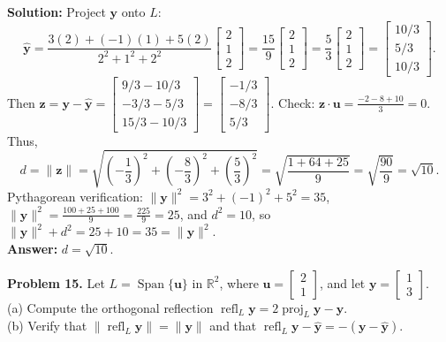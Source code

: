 \documentclass[11pt, letterpaper]{article}
\theoremstyle{definition}
\theoremstyle{remark}
\begin{document}
\textbf{Solution:} Project $\mathbf{y}$ onto $L$:
\[
\hat{\mathbf{y}} = \frac{3(2) + (-1)(1) + 5(2)}{2^2 + 1^2 + 2^2}\begin{bmatrix} 2 \\ 1 \\ 2 \end{bmatrix} = \frac{15}{9}\begin{bmatrix} 2 \\ 1 \\ 2 \end{bmatrix} = \frac{5}{3}\begin{bmatrix} 2 \\ 1 \\ 2 \end{bmatrix} = \begin{bmatrix} 10/3 \\ 5/3 \\ 10/3 \end{bmatrix}.
\]
Then $\mathbf{z} = \mathbf{y} - \hat{\mathbf{y}} = \begin{bmatrix} 9/3 - 10/3 \\ -3/3 - 5/3 \\ 15/3 - 10/3 \end{bmatrix} = \begin{bmatrix} -1/3 \\ -8/3 \\ 5/3 \end{bmatrix}$. Check: $\mathbf{z} \cdot \mathbf{u} = \frac{-2 - 8 + 10}{3} = 0$. Thus,
\[
d = \|\mathbf{z}\| = \sqrt{\left(-\frac{1}{3}\right)^2 + \left(-\frac{8}{3}\right)^2 + \left(\frac{5}{3}\right)^2} = \sqrt{\frac{1 + 64 + 25}{9}} = \sqrt{\frac{90}{9}} = \sqrt{10}.
\]
Pythagorean verification: $\|\mathbf{y}\|^2 = 3^2 + (-1)^2 + 5^2 = 35$, $\|\hat{\mathbf{y}}\|^2 = \frac{100 + 25 + 100}{9} = \frac{225}{9} = 25$, and $d^2 = 10$, so $\|\hat{\mathbf{y}}\|^2 + d^2 = 25 + 10 = 35 = \|\mathbf{y}\|^2$. \\
\textbf{Answer:} $d = \sqrt{10}$.

\textbf{Problem 15.} Let $L = \operatorname{Span}\{\mathbf{u}\}$ in $\mathbb{R}^2$, where $\mathbf{u} = \begin{bmatrix} 2 \\ 1 \end{bmatrix}$, and let $\mathbf{y} = \begin{bmatrix} 1 \\ 3 \end{bmatrix}$. \\
(a) Compute the orthogonal reflection $\operatorname{refl}_L \mathbf{y} = 2\operatorname{proj}_L \mathbf{y} - \mathbf{y}$. \\
(b) Verify that $\|\operatorname{refl}_L \mathbf{y}\| = \|\mathbf{y}\|$ and that $\operatorname{refl}_L \mathbf{y} - \hat{\mathbf{y}} = -(\mathbf{y} - \hat{\mathbf{y}})$.
\end{document}
